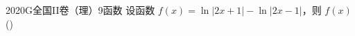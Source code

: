 
\begin{problem}{2020}{G}{全国II卷（理）}{9}{函数}
设函数 $ f(x) = \ln|2x+1| - \ln|2x-1| $，则 $ f(x) $ (\hspace{1cm})
\begin{choices}
\end{choices}
\end{problem}

\begin{answer}

\end{answer}

\begin{solutions}

\end{solutions}